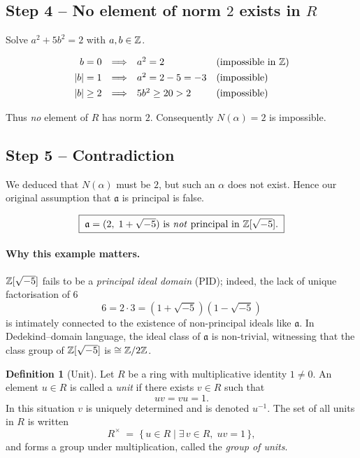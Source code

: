 \documentclass[12pt]{article}
\theoremstyle{definition} %
\newtheorem{definition}{Definition}
\theoremstyle{plain} %
\begin{document}
\subsection*{Step 4 – No element of norm \(2\) exists in \(R\)}

Solve \(a^2 + 5b^2 = 2\) with \(a,b\in\Bbb Z\).

\[
\begin{array}{@{}rcll@{}}
b = 0      &\Longrightarrow& a^{2}=2      &\text{(impossible in }\mathbb Z)\\[4pt]
|b| = 1    &\Longrightarrow& a^{2}=2-5=-3 &\text{(impossible)}\\[4pt]
|b|\ge 2   &\Longrightarrow& 5b^{2}\ge 20>2 &\text{(impossible)}
\end{array}
\]

Thus \emph{no} element of \(R\) has norm \(2\).
Consequently \(N(\alpha)=2\) is impossible.

\subsection*{Step 5 – Contradiction}

We deduced that \(N(\alpha)\) must be \(2\), but such an \(\alpha\) does not exist.
Hence our original assumption that \(\mathfrak a\) is principal is false.

\[
    \boxed{\;\mathfrak a = (2,\;1+\sqrt{-5}) \text{ is \emph{not} principal in } \Bbb Z[\sqrt{-5}].\;}
\]

\paragraph{Why this example matters.}
\(\Bbb Z[\sqrt{-5}]\) fails to be a \emph{principal ideal domain} (PID);
indeed, the lack of unique factorisation of \(6\)
\[
   6 = 2\cdot3 = (1+\sqrt{-5})(1-\sqrt{-5})
\]
is intimately connected to the existence of non-principal ideals like \(\mathfrak a\).
In Dedekind–domain language, the ideal class of \(\mathfrak a\) is non-trivial,
witnessing that the class group of \(\Bbb Z[\sqrt{-5}]\) is \(\cong\Bbb Z/2\Bbb Z\).
\begin{definition}[Unit]
  Let \(R\) be a ring with multiplicative identity \(1\neq 0\).
  An element \(u\in R\) is called a \emph{unit} if there exists
  \(v\in R\) such that
  \[
      uv = vu = 1 .
  \]
  In this situation \(v\) is uniquely determined and is denoted \(u^{-1}\).
  The set of all units in \(R\) is written
  \[
      R^{\times}
      \;=\;
      \{\,u\in R \mid \exists\,v\in R,\; uv=1\,\},
  \]
  and forms a group under multiplication, called the \emph{group of units}.
\end{definition}
\end{document}
